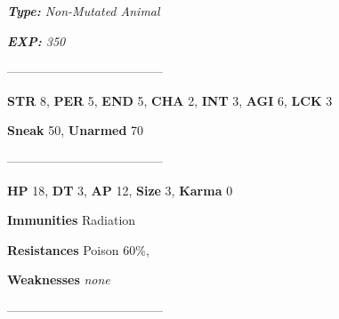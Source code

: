 \documentclass[11pt,a4paper,twocolumn]{book}
\begin{document}
	\emph{\textbf{Type:} Non-Mutated Animal}
	
	\emph{\textbf{EXP:} 350}
	
%		
%	
%		

	--------------------------------------

\noindent
\textbf{STR} 8, \textbf{PER} 5, \textbf{END} 5, \textbf{CHA} 2, \textbf{INT} 3, \textbf{AGI} 6, \textbf{LCK} 3

\noindent
\textbf{Sneak} 50, \textbf{Unarmed} 70 %

--------------------------------------

\noindent
\textbf{HP} 18, \textbf{DT} 3, \textbf{AP} 12, \textbf{Size} 3, \textbf{Karma} 0


\noindent
\textbf{Immunities}  Radiation %

\noindent
\textbf{Resistances} Poison 60\%, %

\noindent
\textbf{Weaknesses} \emph{none}%

--------------------------------------	
	
\end{document}
